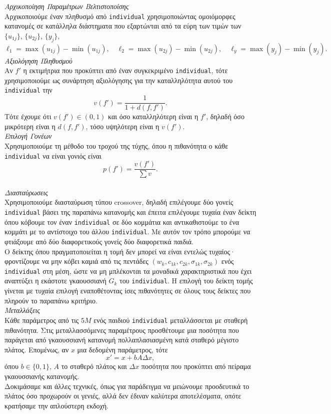 \documentclass[12pt]{article}
\begin{document}
\textit{Αρχικοποίηση Παραμέτρων Βελτιστοποίσης} \\
Αρχικοποιούμε έναν πληθυσμό από \texttt{individual} χρησιμοποιώντας ομοιόμορφες κατανομές σε κατάλληλα διάστηματα που εξαρτώνται από τα εύρη των τιμών των $\{u_{1j}\}$, $\{u_{2j}\}$, $\{y_{j}\}$, 
\[
\ell_1 = \max(u_{1j}) - \min(u_{1j}),\quad \ell_2 = \max(u_{2j}) - \min(u_{2j}), \quad \ell_y = \max(y_j) - \min(y_j)
.\] 
\newpage
\textit{Αξιολόγηση Πληθυσμού} \\
Αν $f'$ η εκτιμήτρια που προκύπτει από έναν συγκεκριμένο \texttt{individual}, τότε χρησιμοποιούμε ως συνάρτηση αξιολόγησης για την καταλληλότητα αυτού του \texttt{individual} την 
\[
v(f') = \dfrac{1}{1 + d(f, f')}
.\]
Τότε έχουμε ότι $v(f') \in (0, 1)$ και όσο καταλληλότερη είναι η $f'$, δηλαδή όσο μικρότερη είναι η $d(f, f')$, τόσο υψηλότερη είναι η $v(f')$. \\

\textit{Επιλογή Γονέων} \\
Χρησιμοποιούμε τη μέθοδο του τροχού της τύχης, όπου η πιθανότητα ο κάθε \texttt{individual} να είναι γονιός είναι 
\[
p(f') = \dfrac{v(f')}{\sum v}
.\] \\ 

\textit{Διασταύρωσεις} \\
Χρησιμοποιούμε διασταύρωση τύπου crossover, δηλαδή επιλέγουμε δύο γονείς \texttt{individual} βάσει της παραπάνω κατανομής και έπειτα επιλέγουμε τυχαία έναν δείκτη όπου κόβουμε τον έναν \texttt{individual} σε δύο κομμάτια και αντικαθιστούμε το ένα κομμάτι με το αντίστοιχο του άλλου \texttt{individual}. Με αυτόν τον τρόπο μπορούμε να φτιάξουμε από δύο διαφορετικούς γονείς δύο διαφορετικά παιδιά. \\
Ο δείκτης όπου πραγματοποιείται η τομή δεν μπορεί να είναι εντελώς τυχαίος· φροντίζουμε να μην κόβει καμιά από τις πεντάδες 
$(w_k, c_{1k}, c_{2k}, \sigma_{1k}, \sigma_{2k})$
ενός \texttt{individual} στη μέση, ώστε να μη μπλέκονται τα μοναδικά χαρακτηριστικά που έχει αναπτύξει η εκάστοτε γκαουσσιανή $G_k$ του \texttt{individual}. 
Η επιλογή του δείκτη τομής γίνεται με τυχαία επιλογή εναποθέτοντας ίσες πιθανότητες σε όλους τους δείκτες που πληρούν το παραπάνω κριτήριο. \\

\textit{Μεταλλάξεις}\\
Κάθε παράμετρος από τις $5M$ ενός παιδιού \texttt{individual} μεταλλάσσεται με σταθερή πιθανότητα. Στις μεταλλασσόμενες παραμέτρους προσθέτουμε μια ποσότητα που παράγεται από γκαουσσιανή κατανομή πολλαπλασιασμένη κατά σταθερό μέγιστο πλάτος. Επομένως, αν \(x\) μια δεδομένη παράμετρος, τότε 
\[
x' = x + bA \Delta x
,\]
όπου $b \in \{0, 1\}$, $Α$ το σταθερό πλάτος και $\Delta x$ ποσότητα που προκύπτει από πείραμα γκαουσσιανής κατανομής. \\
Δοκιμάσαμε και άλλες τεχνικές, όπως για παράδειγμα να μειώνουμε προοδευτικά το πλάτος όσο προχωρούν οι γενιές, αλλά δεν έδιναν καλύτερα αποτελέσματα, οπότε κρατήσαμε την απλούστερη εκδοχή. \\
\end{document}
